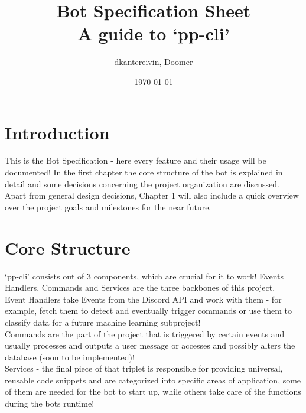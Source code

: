 \documentclass[12pt,oneside]{book}
\title{{\Large Bot Specification Sheet}\\{\small A guide to `pp-cli'}}
\author{dkantereivin, Doomer}
\date{\today}
\begin{document}
\maketitle
\tableofcontents
\chapter{Introduction}
    This is the Bot Specification - here every feature and their usage will
    be documented! In the first chapter the core structure of the bot is 
    explained in detail and some decisions concerning the project organization
    are discussed. Apart from general design decisions, Chapter 1 will also 
    include a quick overview over the project goals and milestones for the 
    near future.

\chapter[Core]{Core Structure}
    `pp-cli' consists out of 3 components, which are crucial for it to work!
    Events Handlers, Commands and Services are the three backbones of this 
    project.\\
    Event Handlers take Events from the Discord API and work with them - for 
    example, fetch them to detect and eventually trigger commands or use them 
    to classify data for a future machine learning subproject!\\
    Commands are the part of the project that is triggered by certain events
    and usually processes and outputs a user message or accesses and possibly
    alters the database (soon to be implemented)!\\
    Services - the final piece of that triplet is responsible for providing 
    universal, reusable code snippets and are categorized into specific 
    areas of application, some of them are needed for the bot to start up, 
    while others take care of the functions during the bots runtime!
\end{document}

